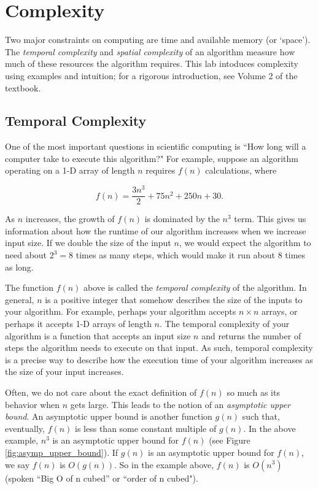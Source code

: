 
\label{lab:complexity}

\section*{Complexity} 
Two major constraints on computing are time and available memory (or `space').
The \emph{temporal complexity} and \emph{spatial complexity} of an algorithm measure how much of these resources the algorithm requires. 
This lab intoduces complexity using examples and intuition; for a rigorous introduction, see Volume 2 of the textbook.

\subsection*{Temporal Complexity}
One of the most important questions in scientific computing is ``How long will a computer take to execute this algorithm?"
For example, suppose an algorithm operating on a 1-D array of length $n$ requires $f(n)$ calculations, where

\begin{equation*}
f(n) = \frac{3n^3}{2} + 75n^2 + 250n + 30.
\end{equation*}

As $n$ increases, the growth of $f(n)$ is dominated by the $n^3$ term.
This gives us information about how the runtime of our algorithm increases when we increase input size. 
If we double the size of the input $n$, we would expect the algorithm to need about $2^3=8$ times as many steps, which would make it run about 8 times as long.

The function $f(n)$ above is called the \emph{temporal complexity} of the algorithm. 
In general, $n$ is a positive integer that somehow describes the size of the inputs to your algorithm. 
For example, perhaps your algorithm accepts $n \times n$ arrays, or perhaps it accepts 1-D arrays of length $n$. 
The temporal complexity of your algorithm is a function that accepts an input size $n$ and returns the number of steps the algorithm needs to execute on that input. 
As such, temporal complexity is a precise way to describe how the execution time of your algorithm increases as the size of your input increases.

Often, we do not care about the exact definition of $f(n)$ so much as its behavior when $n$ gets large. 
This leads to the notion of an \emph{asymptotic upper bound}. 
An asymptotic upper bound is another function $g(n)$ such that, eventually, $f(n)$ is less than some constant multiple of $g(n)$. 
In the above example, $n^3$ is an asymptotic upper bound for $f(n)$ (see Figure \ref{fig:asymp_upper_bound}). 
If $g(n)$ is an asymptotic upper bound for $f(n)$, we say $f(n)$ is $O(g(n))$. 
So in the example above, $f(n)$ is $O(n^3)$ (spoken ``Big O of n cubed'' or ``order of n cubed").

